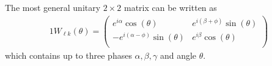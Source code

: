 The most general unitary $2\times2$ matrix can be written as
\begin{alignat}{1}
	\label{mix:4} W_{\ell k}(\theta) = 
    \left(
    \begin{array}{cc}
         e^{i \alpha } \cos (\theta ) & e^{i (\beta +\phi )} \sin (\theta ) \\
         -e^{i (\alpha -\phi )} \sin (\theta ) & e^{i \beta } \cos (\theta ) \\
    \end{array}
    \right)
\end{alignat}
which contains up to three phases $\alpha,\beta,\gamma$ and angle $\theta$. 